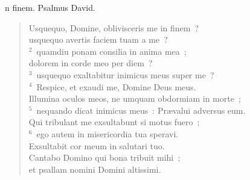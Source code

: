 \bchapter
{}n finem. Psalmus David. \begin{flushleft}\begin{verse}\vspace{6pt}Usquequo, Domine, oblivisceris me in finem~?\\ usquequo avertis faciem tuam a me~?\\
${}^{2}$~quamdiu ponam consilia in anima mea~;\\ dolorem in corde meo per diem~?\\
${}^{3}$~usquequo exaltabitur inimicus meus super me~?\\
${}^{4}$~Respice, et exaudi me, Domine Deus meus.\\ Illumina oculos meos, ne umquam obdormiam in morte~;\\
${}^{5}$~nequando dicat inimicus meus~: Pr\ae valui adversus eum.\\ Qui tribulant me exsultabunt si motus fuero~;\\
${}^{6}$~ego autem in misericordia tua speravi.\\ Exsultabit cor meum in salutari tuo.\\ Cantabo Domino qui bona tribuit mihi~;\\ et psallam nomini Domini altissimi.\end{verse}\end{flushleft}



